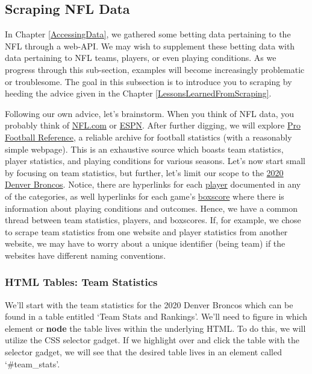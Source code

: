 \documentclass[
]{article}
\begin{document}
\hypertarget{scraping-nfl-data-1}{%
\subsection{Scraping NFL Data}\label{scraping-nfl-data-1}}

In Chapter \ref{AccessingData}, we gathered some betting data pertaining to the NFL through a web-API. We may wish to supplement these betting data with data pertaining to NFL teams, players, or even playing conditions. As we progress through this sub-section, examples will become increasingly problematic or troublesome. The goal in this subsection is to introduce you to scraping by heeding the advice given in the Chapter \ref{LessonsLearnedFromScraping}.

Following our own advice, let's brainstorm. When you think of NFL data, you probably think of \href{https://www.nfl.com/stats}{NFL.com} or \href{https://www.espn.com/nfl/stats}{ESPN}. After further digging, we will explore \href{https://www.pro-football-reference.com/}{Pro Football Reference}, a reliable archive for football statistics (with a reasonably simple webpage). This is an exhaustive source which boasts team statistics, player statistics, and playing conditions for various seasons. Let's now start small by focusing on team statistics, but further, let's limit our scope to the \href{https://www.pro-football-reference.com/teams/den/2020.htm}{2020 Denver Broncos}. Notice, there are hyperlinks for each \href{https://www.pro-football-reference.com/players/G/GordMe00.htm}{player} documented in any of the categories, as well hyperlinks for each game's \href{https://www.pro-football-reference.com/boxscores/202009140den.htm}{boxscore} where there is information about playing conditions and outcomes. Hence, we have a common thread between team statistics, players, and boxscores. If, for example, we chose to scrape team statistics from one website and player statistics from another website, we may have to worry about a unique identifier (being team) if the websites have different naming conventions.

\hypertarget{html-tables-team-statistics-1}{%
\subsubsection{HTML Tables: Team Statistics}\label{html-tables-team-statistics-1}}

We'll start with the team statistics for the 2020 Denver Broncos which can be found in a table entitled `Team Stats and Rankings'. We'll need to figure in which element or \textbf{node} the table lives within the underlying HTML. To do this, we will utilize the CSS selector gadget. If we highlight over and click the table with the selector gadget, we will see that the desired table lives in an element called `\#team\_stats'.
\end{document}
